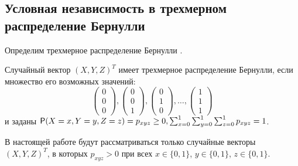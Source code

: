 \subsection{Условная независимость в трехмерном распределение Бернулли}\label{ci_and_bernoulli}

Определим трехмерное распределение Бернулли \cite{Dai2013, Teugels1990}.
\begin{definition}
    Случайный вектор $(X,Y,Z)^T$ имеет трехмерное распределение Бернулли,
    если множество его возможных значений:
    $$
        \begin{pmatrix}
            0 \\
            0 \\
            0
        \end{pmatrix},
        \begin{pmatrix}
            0 \\
            0 \\
            1
        \end{pmatrix},
        \begin{pmatrix}
            0 \\
            1 \\
            0
        \end{pmatrix}, \ldots, \begin{pmatrix}
            1 \\
            1 \\
            1
        \end{pmatrix}
    $$ и заданы $\mathsf{P}(X=x,Y=y,Z=z)=p_{xyz} \geq 0,  \sum_{x=0}^1 \sum_{y=0}^1 \sum_{z=0}^1 p_{xyz} =1$.
\end{definition}
В настоящей работе будут рассматриваться
только случайные векторы $(X,Y,Z)^T$, в которых
$p_{xyz}>0$ при всех 
$x \in \{0,1\}$, $y\in \{0,1\}$, $z\in \{0,1\}$.


